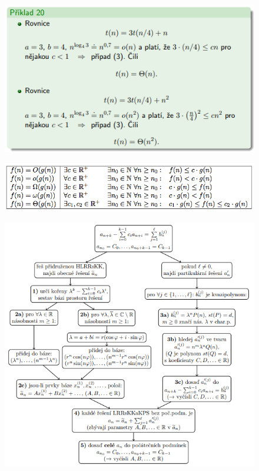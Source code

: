 \documentclass{szzclass}
\begin{document}
\begin{figure}[h]
    \includegraphics[width=\textwidth, center]{topics/bi-spol-32/images/mt2.PNG}
\end{figure}

\begin{figure}[h]
    \includegraphics[width=\textwidth, center]{topics/bi-spol-32/images/slozitost.png}
\end{figure}


\begin{figure}[h]
    \includegraphics[width=1\textwidth, center]{topics/bi-spol-32/images/kuchar.PNG}
\end{figure}
    
\end{document}
